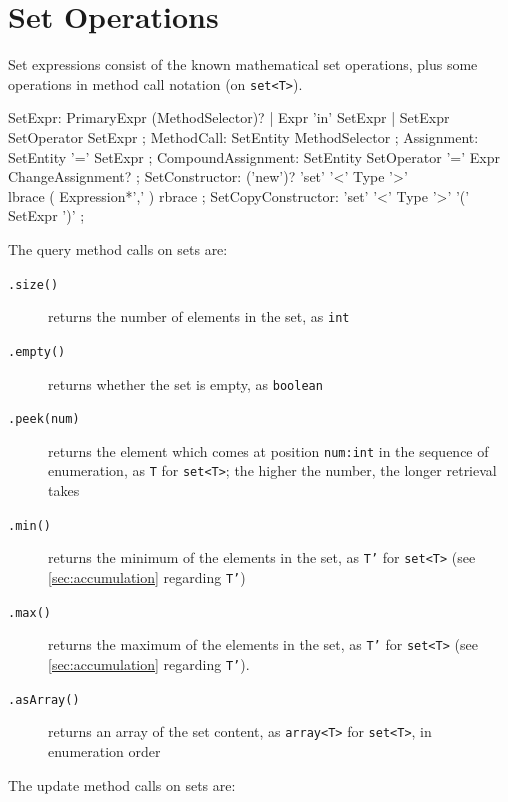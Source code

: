 \section{Set Operations}\label{sec:setexpr}

Set expressions consist of the known mathematical set operations, plus some operations in method call notation (on \texttt{set<T>}).

\begin{rail}
  SetExpr: PrimaryExpr (MethodSelector)? | Expr 'in' SetExpr | SetExpr SetOperator SetExpr ;
  MethodCall: SetEntity MethodSelector ;
  Assignment: SetEntity '=' SetExpr ;
  CompoundAssignment: SetEntity SetOperator '=' Expr ChangeAssignment? ;
  SetConstructor: ('new')? 'set' '<' Type '>' \\ lbrace ( Expression*',' ) rbrace ;
  SetCopyConstructor: 'set' '<' Type '>' '(' SetExpr ')' ;
\end{rail}

\noindent The query method calls on sets are:

\begin{description}
\item[\texttt{.size()}] returns the number of elements in the set, as \texttt{int}
\item[\texttt{.empty()}] returns whether the set is empty, as \texttt{boolean}
\item[\texttt{.peek(num)}] returns the element which comes at position \texttt{num:int} in the sequence of enumeration, as \texttt{T} for \verb#set<T>#; the higher the number, the longer retrieval takes
\item[\texttt{.min()}] returns the minimum of the elements in the set, as \texttt{T'} for \texttt{set<T>} (see \ref{sec:accumulation} regarding \texttt{T'})
\item[\texttt{.max()}] returns the maximum of the elements in the set, as \texttt{T'} for \texttt{set<T>} (see \ref{sec:accumulation} regarding \texttt{T'}).
\item[\texttt{.asArray()}] returns an array of the set content, as \verb#array<T># for \verb#set<T>#, in enumeration order
\end{description}

\noindent The update method calls on sets are:

